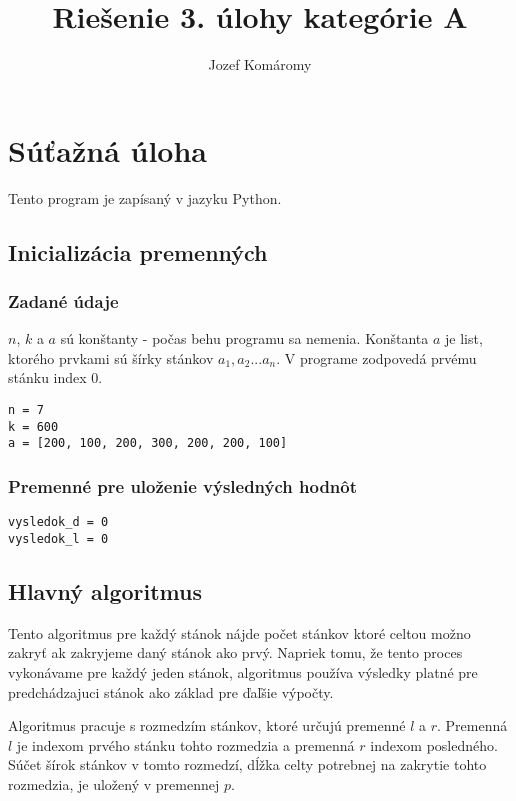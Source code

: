 \documentclass{article}
\begin{document}
\title{Riešenie 3. úlohy kategórie A}
\author{Jozef Komáromy}

\maketitle


\section{Súťažná úloha}

Tento program je zapísaný v jazyku Python.

\subsection{Inicializácia premenných}

\subsubsection*{Zadané údaje}
$n$, $k$ a $a$ sú konštanty - počas behu programu sa nemenia. Konštanta $a$ je list, ktorého prvkami sú šírky stánkov $a_{1}, a_{2} ... a_{n}$. V programe zodpovedá prvému stánku index $0$.
\begin{lstlisting}
n = 7
k = 600
a = [200, 100, 200, 300, 200, 200, 100]
\end{lstlisting}
\subsubsection*{Premenné pre uloženie výsledných hodnôt}
\begin{lstlisting}
vysledok_d = 0
vysledok_l = 0
\end{lstlisting}

\subsection{Hlavný algoritmus}

Tento algoritmus pre každý stánok nájde počet stánkov ktoré celtou možno zakryť ak zakryjeme daný stánok ako prvý. Napriek tomu, že tento proces vykonávame pre každý jeden stánok, algoritmus používa výsledky platné pre predchádzajuci stánok ako základ pre ďaľšie výpočty.

Algoritmus pracuje s rozmedzím stánkov, ktoré určujú premenné $l$ a $r$. Premenná $l$ je indexom prvého stánku tohto rozmedzia a premenná $r$ indexom posledného. Súčet šírok stánkov v tomto rozmedzí, dĺžka celty potrebnej na zakrytie tohto rozmedzia, je uložený v premennej $p$.
\end{document}
